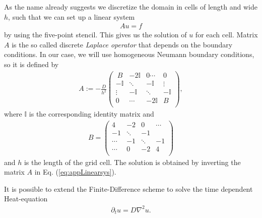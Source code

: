 \documentclass[10pt,twocolumn]{revtex4-1}
\begin{document}
	As the name already suggests we discretize the domain in cells of length and wide $h$, such that we can set up a linear system 
	\begin{align}
	Au=f
	\label{eq:appLinearsys}
	\end{align}
	by using the five-point stencil. This gives us the solution of $u$ for each cell. Matrix $A$ is the so called discrete \textit{Laplace operator} that depends on the boundary conditions. In our case, we will use homogeneous Neumann boundary conditions, so it is defined by
	\begin{align*}
	A:=-\frac{D}{h^{2}}\left( \begin{array}{rrrr}
	\ B & -2\mathbb{I} & 0 \cdots & 0 \\
	-\mathbb{I} & \ddots & -\mathbb{I} & \vdots \\
	\vdots & -\mathbb{I} & \ddots & -\mathbb{I} \\
	0 & \cdots & -2\mathbb{I} & B \\
	\end{array}\right) ,
	\end{align*} 
	where $\mathbb{I}$ is the corresponding identity matrix and
	\begin{align*}
	{B=\left( \begin{array}{rrrr}
		4& -2 & 0& \cdots \\
		-1 & \ddots & -1  \\
		\cdots & -1& \ddots & -1\\
		\cdots &0 & -2& 4 \\
		\end{array}\right)} 
	\end{align*} 
	and $h$ is the length of the grid cell. The solution is obtained by inverting the matrix $A$ in Eq. (\ref{eq:appLinearsys}). 
	
	It is possible to extend the Finite-Difference scheme to solve the time dependent Heat-equation
	\begin{align}
	\label{TimeEq}
	\partial_{t}u = D\nabla^2 u.
	\end{align}
	
\end{document}
